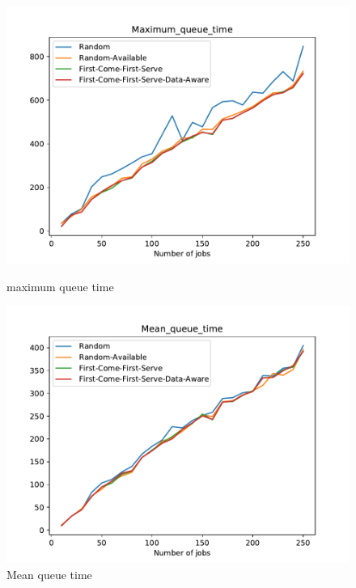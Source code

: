 \documentclass[a4paper]{article}
\begin{document}
\begin{figure}[ht] 
  \label{ fig7} 
  \begin{minipage}[b]{0.5\linewidth}
    \centering
    \includegraphics[width=1.11\linewidth]{MBSS/plot/Maximum_queue_time.pdf} 
    \caption{maximum queue time} 
    \vspace{4ex}
  \end{minipage}%
  \begin{minipage}[b]{0.5\linewidth}
    \centering
    \includegraphics[width=1.11\linewidth]{MBSS/plot/Mean_queue_time.pdf} 
    \caption{Mean queue time} 
    \vspace{4ex}
  \end{minipage} 
  \begin{minipage}[b]{0.5\linewidth}

\end{minipage}
\end{figure}
\end{document}
